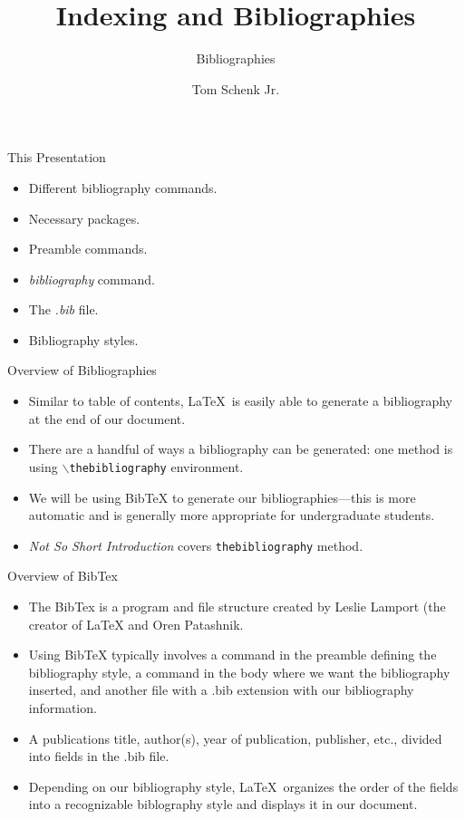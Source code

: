 \documentclass[pdf]{prosper}
\title{Indexing and Bibliographies}
\subtitle{Bibliographies}
\author{Tom Schenk Jr.}		%
\begin{document}
\maketitle
\begin{slide}{This Presentation}
	\begin{itemize}
		\item Different bibliography commands.
		\item Necessary packages.
		\item Preamble commands.
		\item \textit{bibliography} command.
		\item The \textit{.bib} file.
		\item Bibliography styles.
	\end{itemize}
\end{slide}
\begin{slide}{Overview of Bibliographies}
	\begin{itemize}
		\item Similar to table of contents, \LaTeX\ is easily able to generate a bibliography at the end of our document.
		\item There are a handful of ways a bibliography can be generated: one method is using \texttt{$\backslash$thebibliography} environment.
		\item We will be using BibTeX to generate our bibliographies---this is more automatic and is generally more appropriate for undergraduate students.
		\item \textit{Not So Short Introduction} covers \texttt{thebibliography} method.
	\end{itemize}
\end{slide}
\begin{slide}{Overview of BibTex}
	\begin{itemize}
		\item The BibTex is a program and file structure created by Leslie Lamport (the creator of \LaTeX\) and Oren Patashnik.
		\item Using BibTeX typically involves a command in the preamble defining the bibliography style, a command in the body where we want the bibliography inserted, and another file with a .bib extension with our bibliography information.
		\item A publications title, author(s), year of publication, publisher, etc., divided into fields in the .bib file.
		\item Depending on our bibliography style, \LaTeX\ organizes the order of the fields into a recognizable biblography style and displays it in our document.
	\end{itemize}
\end{slide}
\end{document}
